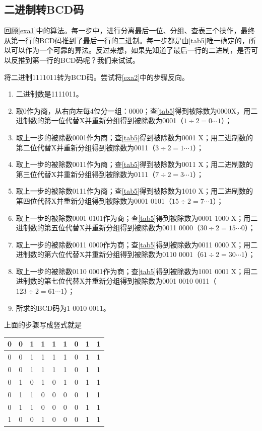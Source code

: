 \subsection{二进制转BCD码}
回顾\autoref{exa1}中的算法。每一步中，进行分离最后一位、分组、查表三个操作，最终从第一行的BCD码推到了最后一行的二进制。每一步都是由\autoref{tab5}唯一确定的，所以可以作为一个可靠的算法。反过来想，如果先知道了最后一行的二进制，是否可以反推到第一行的BCD码呢？我们来试试。
\begin{example}
将二进制1111011转为BCD码。尝试将\autoref{exa2}中的步骤反向。
\begin{enumerate}
\item 二进制数是1111011。
\item 取0作为商，从右向左每4位分一组：0000；查\autoref{tab5}得到被除数为0000X，用二进制数的第一位代替X并重新分组得到被除数为0001（$1\div 2=0\cdots 1$）；
\item 取上一步的被除数0001作为商；查\autoref{tab5}得到被除数为0001 X；用二进制数的第二位代替X并重新分组得到被除数为0011（$3\div 2=1\cdots 1$）；
\item 取上一步的被除数0011作为商；查\autoref{tab5}得到被除数为0011 X；用二进制数的第三位代替X并重新分组得到被除数为0111（$7\div 2=3\cdots 1$）；
\item 取上一步的被除数0111作为商；查\autoref{tab5}得到被除数为1010 X；用二进制数的第四位代替X并重新分组得到被除数为0001 0101（$15\div 2=7\cdots 1$）；
\item 取上一步的被除数0001 0101作为商；查\autoref{tab5}得到被除数为0001 1000 X；用二进制数的第五位代替X并重新分组得到被除数为0011 0000（$30\div 2=15\cdots 0$）；
\item 取上一步的被除数0011 0000作为商；查\autoref{tab5}得到被除数为0011 0000 X；用二进制数的第六位代替X并重新分组得到被除数为0110 0001（$61\div 2=30\cdots 1$）；
\item 取上一步的被除数0110 0001作为商；查\autoref{tab5}得到被除数为1001 0001 X；用二进制数的第七位代替X并重新分组得到被除数为0001 0010 0011（$123\div 2=61\cdots 1$）；
\item 所求的BCD码为1 0010 0011。
\end{enumerate}
上面的步骤写成竖式就是
\begin{center}
\begin{tabular}{|ccccccccc|}
\hline
0&0&1&\multicolumn{1}{|c}{1}&1&1&0&1&1\\\hline
0&0&1&1&\multicolumn{1}{|c}{1}&1&0&1&1\\\hline
0&0&1&1&1&\multicolumn{1}{|c}{1}&0&1&1\\\hline
0&1&\multicolumn{1}{|c}{0}&1&0&1&\multicolumn{1}{|c}{0}&1&1\\\hline
0&1&1&\multicolumn{1}{|c}{0}&0&0&0&\multicolumn{1}{|c}{1}&1\\\hline
0&1&1&0&\multicolumn{1}{|c}{0}&0&0&1&\multicolumn{1}{|c|}{1}\\\hline
1&\multicolumn{1}{|c}{0}&0&1&0&\multicolumn{1}{|c}{0}&0&1&1\\\hline
\end{tabular}
\end{center}
\end{example}

